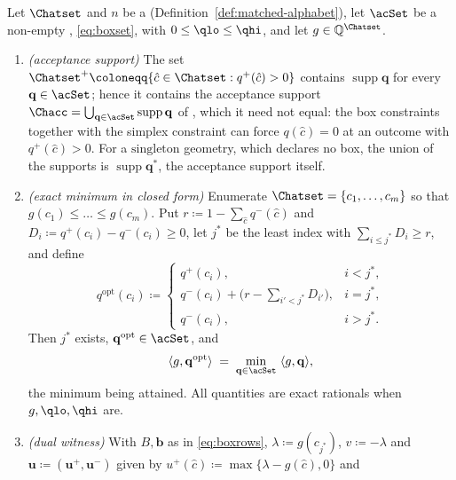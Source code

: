 \begin{theorem}\label{thm:box-oracle}
Let $\Chatset$ and $n$ be a 
(Definition~\ref{def:matched-alphabet}), let $\acSet$ be a non-empty
, \eqref{eq:boxset}, with
$0\le\qlo\le\qhi$, and let $g\in\mathbb{Q}^{\Chatset}$.
\begin{enumerate}[label=(\roman*),leftmargin=2.2em]
\item \emph{(acceptance support)} The set
$\Chatset^{+}\coloneqq\{\hat c\in\Chatset: q^{+}(\hat c)>0\}$ contains
$\operatorname{supp}\mathbf{q}$ for every $\mathbf{q}\in\acSet$; hence it
contains the acceptance support
$\Chacc=\bigcup_{\mathbf{q}\in\acSet}\operatorname{supp}\mathbf{q}$ of
, which it need not equal: the box
constraints together with the simplex constraint can force $q(\hat c)=0$ at an
outcome with $q^{+}(\hat c)>0$. For a $\mathrm{singleton}$ geometry, which
declares no box, the union of the supports is
$\operatorname{supp}\mathbf{q}^{\ast}$, the acceptance support itself.
\item \emph{(exact minimum in closed form)} Enumerate
$\Chatset=\{c_1,\dots,c_m\}$ so that $g(c_1)\le\dots\le g(c_m)$. Put
$r\coloneqq1-\sum_{\hat c}q^{-}(\hat c)$ and
$D_i\coloneqq q^{+}(c_i)-q^{-}(c_i)\ge0$, let $j^{\ast}$ be the least index
with $\sum_{i\le j^{\ast}}D_i\ge r$, and define
\begin{equation}\label{eq:greedy}
  q^{\mathrm{opt}}(c_i)\coloneqq
  \begin{cases}
    q^{+}(c_i), & i<j^{\ast},\\[2pt]
    q^{-}(c_i)+\big(r-\sum_{i'<j^{\ast}}D_{i'}\big), & i=j^{\ast},\\[2pt]
    q^{-}(c_i), & i>j^{\ast}.
  \end{cases}
\end{equation}
Then $j^{\ast}$ exists, $\mathbf{q}^{\mathrm{opt}}\in\acSet$, and
\begin{equation}\label{eq:exactmin}
  \langle g,\mathbf{q}^{\mathrm{opt}}\rangle
  \;=\;\min_{\mathbf{q}\in\acSet}\ \langle g,\mathbf{q}\rangle ,
\end{equation}
the minimum being attained. All quantities are exact rationals when
$g,\qlo,\qhi$ are.
\item \emph{(dual witness)} With $B,\mathbf{b}$ as in
\eqref{eq:boxrows}, $\lambda\coloneqq g(c_{j^{\ast}})$, $v\coloneqq-\lambda$ and
$\mathbf{u}\coloneqq(\mathbf{u}^{+},\mathbf{u}^{-})$ given by
$u^{+}(\hat c)\coloneqq\max\{\lambda-g(\hat c),0\}$ and

\end{enumerate}
\end{theorem}
